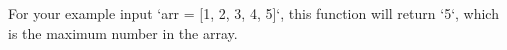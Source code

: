 \documentclass[preview]{standalone}
\begin{document}
For your example input `arr = [1, 2, 3, 4, 5]`, this function will return `5`, which is the maximum number in the array.\\
\end{document}
